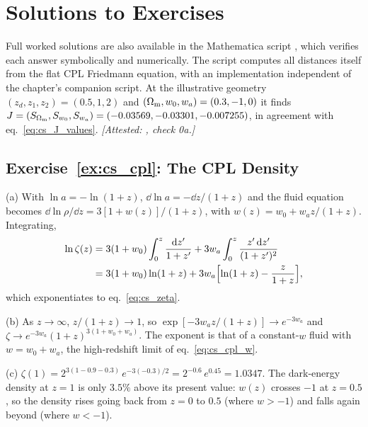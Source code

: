 
\section{Solutions to Exercises}
\label{sec:cs_solutions}

\noindent
Full worked solutions are also available in the Mathematica script
,
which verifies each answer symbolically and numerically. The script
computes all distances itself from the flat CPL Friedmann equation, with
an implementation independent of the chapter's companion script. At the
illustrative geometry $(z_d,z_1,z_2)=(0.5,1,2)$ and
$(\Omega_{\mathrm{m}},w_0,w_a)=(0.3,-1,0)$ it finds
$J=(S_{\Omega_{\mathrm{m}}},S_{w_0},S_{w_a})=(-0.03569,-0.03301,-0.007255)$, in
agreement with eq.~\eqref{eq:cs_J_values}.
\emph{[Attested: , check 0a.]}

\subsection*{Exercise~\ref{ex:cs_cpl}: The CPL Density}

(a) With $\ln a=-\ln(1+z)$, $\dd\ln a=-\dd z/(1+z)$ and the
fluid equation becomes $\dd\ln\rho/\dd z=3[1+w(z)]/(1+z)$, with
$w(z)=w_0+w_az/(1+z)$. Integrating,
\begin{align*}
  \ln\zeta(z)
  &=3(1+w_0)\int_0^z\frac{\dd z'}{1+z'}
   +3w_a\int_0^z\frac{z'\,\dd z'}{(1+z')^2}\\
  &=3(1+w_0)\ln(1+z)+3w_a\Bigl[\ln(1+z)-\frac{z}{1+z}\Bigr],
\end{align*}
which exponentiates to eq.~\eqref{eq:cs_zeta}.

(b) As $z\to\infty$, $z/(1+z)\to1$, so
$\exp[-3w_az/(1+z)]\to e^{-3w_a}$ and
$\zeta\to e^{-3w_a}(1+z)^{3(1+w_0+w_a)}$. The exponent is that of a
constant-$w$ fluid with $w=w_0+w_a$, the high-redshift limit of
eq.~\eqref{eq:cs_cpl_w}.

(c) $\zeta(1)=2^{3(1-0.9-0.3)}\,e^{-3(-0.3)/2}
=2^{-0.6}\,e^{0.45}=1.0347$. The dark-energy density at $z=1$ is only
$3.5\%$ above its present value: $w(z)$ crosses $-1$ at $z=0.5$, so the
density rises going back from $z=0$ to $0.5$ (where $w>-1$) and falls
again beyond (where $w<-1$).

